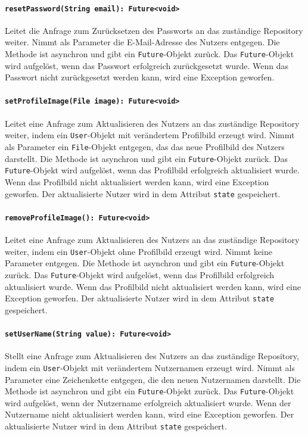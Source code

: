 \documentclass{entwurfsheft}
\begin{document}
\begin{sloppypar}
\paragraph{\texttt{resetPassword(String email): Future<void>}}
Leitet die Anfrage zum Zurücksetzen des Passworts an das zuständige Repository weiter. Nimmt als Parameter die E-Mail-Adresse des Nutzers entgegen. Die Methode ist asynchron und gibt ein \texttt{Future}-Objekt zurück. Das \texttt{Future}-Objekt wird aufgelöst, wenn das Passwort erfolgreich zurückgesetzt wurde. Wenn das Passwort nicht zurückgesetzt werden kann, wird eine Exception geworfen.
\paragraph{\texttt{setProfileImage(File image): Future<void>}}
Leitet eine Anfrage zum Aktualisieren des Nutzers an das zuständige Repository weiter, indem ein \texttt{User}-Objekt mit verändertem Profilbild erzeugt wird. Nimmt als Parameter ein \texttt{File}-Objekt entgegen, das das neue Profilbild des Nutzers darstellt. Die Methode ist asynchron und gibt ein \texttt{Future}-Objekt zurück. Das \texttt{Future}-Objekt wird aufgelöst, wenn das Profilbild erfolgreich aktualisiert wurde. Wenn das Profilbild nicht aktualisiert werden kann, wird eine Exception geworfen. Der aktualisierte Nutzer wird in dem Attribut \texttt{state} gespeichert.
\paragraph{\texttt{removeProfileImage(): Future<void>}}
Leitet eine Anfrage zum Aktualisieren des Nutzers an das zuständige Repository weiter, indem ein \texttt{User}-Objekt ohne Profilbild erzeugt wird. Nimmt keine Parameter entgegen. Die Methode ist asynchron und gibt ein \texttt{Future}-Objekt zurück. Das \texttt{Future}-Objekt wird aufgelöst, wenn das Profilbild erfolgreich aktualisiert wurde. Wenn das Profilbild nicht aktualisiert werden kann, wird eine Exception geworfen. Der aktualisierte Nutzer wird in dem Attribut \texttt{state} gespeichert.
\paragraph{\texttt{setUserName(String value): Future<void>}}
Stellt eine Anfrage zum Aktualisieren des Nutzers an das zuständige Repository, indem ein \texttt{User}-Objekt mit verändertem Nutzernamen erzeugt wird. Nimmt als Parameter eine Zeichenkette entgegen, die den neuen Nutzernamen darstellt. Die Methode ist asynchron und gibt ein \texttt{Future}-Objekt zurück. Das \texttt{Future}-Objekt wird aufgelöst, wenn der Nutzername erfolgreich aktualisiert wurde. Wenn der Nutzername nicht aktualisiert werden kann, wird eine Exception geworfen. Der aktualisierte Nutzer wird in dem Attribut \texttt{state} gespeichert.


\end{sloppypar}
\end{document}
